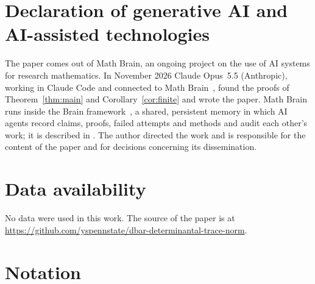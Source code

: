 \documentclass[11pt]{amsart}
\theoremstyle{remark}
\numberwithin{equation}{section}
\begin{document}
\section*{Declaration of generative AI and AI-assisted technologies}
The paper comes out of Math Brain, an ongoing project on the use of AI systems for research mathematics. In November 2026 Claude Opus~5.5 (Anthropic), working in Claude Code and connected to Math Brain~\cite{MathBrainRepo}, found the proofs of Theorem~\ref{thm:main} and Corollary~\ref{cor:finite} and wrote the paper. Math Brain runs inside the Brain framework~\cite{BrainFramework}, a shared, persistent memory in which AI agents record claims, proofs, failed attempts and methods and audit each other's work; it is described in \cite{MathBrainPaper}. The author directed the work and is responsible for the content of the paper and for decisions concerning its dissemination.

\section*{Data availability}
No data were used in this work. The source of the paper is at \url{https://github.com/yspennstate/dbar-determinantal-trace-norm}.

\appendix
\section{Notation}\label{app:notation}
\end{document}
